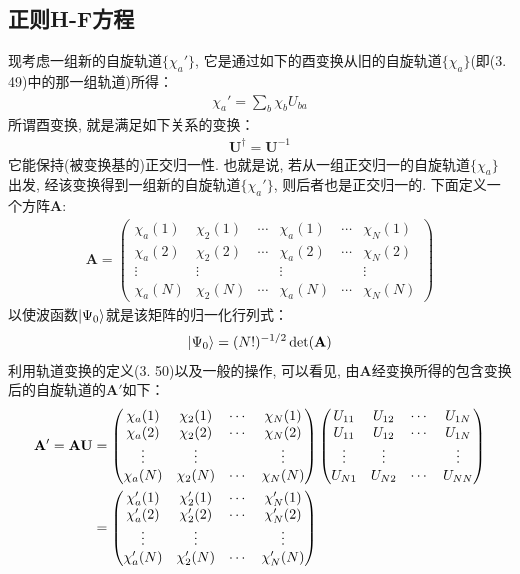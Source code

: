 \subsection{正则H-F方程}
现考虑一组新的自旋轨道$\{\chi_a'\}$, 
它是通过如下的酉变换从旧的自旋轨道$\{\chi_a\}$(即(3.
49)中的那一组轨道)所得：
\begin{align}
	\chi_a' = \sum_b\chi_bU_{ba}
\end{align}
所谓酉变换, 
就是满足如下关系的变换：
\begin{align}
	\mathbf{U}^\dagger = \mathbf{U}^{-1}
\end{align}
它能保持(被变换基的)正交归一性. 
也就是说, 
若从一组正交归一的自旋轨道$\{\chi_a\}$出发, 
经该变换得到一组新的自旋轨道$\{\chi_a'\}$, 
则后者也是正交归一的. 
下面定义一个方阵$\mathbf{A}$:
\begin{align}
	\mathbf{A} = 
	\begin{pmatrix}
		\chi_a(1) & \chi_2(1) & \cdots & \chi_a(1) & \cdots & \chi_N(1) \\
		\chi_a(2) & \chi_2(2) & \cdots & \chi_a(2) & \cdots & \chi_N(2) \\
		\vdots    & \vdots    &        & \vdots    &        & \vdots    \\
		\chi_a(N) & \chi_2(N) & \cdots & \chi_a(N) & \cdots & \chi_N(N)
	\end{pmatrix}
\end{align}
以使波函数$\Ket{\Psi_0}$就是该矩阵的归一化行列式：
\begin{align}
	\Ket{\Psi_0} = (N!)^{-1/2}\det(\mathbf{A})
\end{align}
利用轨道变换的定义(3.
50)以及一般的操作, 
可以看见, 
由$\mathbf{A}$经变换所得的包含变换后的自旋轨道的$\mathbf{A}'$如下：
\begin{align}
	\mathbf{A}'  = \mathbf{AU} & = 
	\begin{pmatrix}
		\chi_a(1) & \chi_2(1) & \cdots & \chi_N(1) \\
		\chi_a(2) & \chi_2(2) & \cdots & \chi_N(2) \\
		\vdots    & \vdots    &        & \vdots    \\
		\chi_a(N) & \chi_2(N) & \cdots & \chi_N(N)
	\end{pmatrix}
	\begin{pmatrix}
		U_{11} & U_{12} & \cdots & U_{1N} \\
		U_{11} & U_{12} & \cdots & U_{1N} \\
		\vdots & \vdots &        & \vdots \\
		U_{N1} & U_{N2} & \cdots & U_{NN}
	\end{pmatrix} \notag\\
	& = \begin{pmatrix}
		\chi_a'(1) & \chi_2'(1) & \cdots & \chi_N'(1) \\
		\chi_a'(2) & \chi_2'(2) & \cdots & \chi_N'(2) \\
		\vdots     & \vdots     &        & \vdots     \\
		\chi_a'(N) & \chi_2'(N) & \cdots & \chi_N'(N)
	\end{pmatrix}
\end{align}
